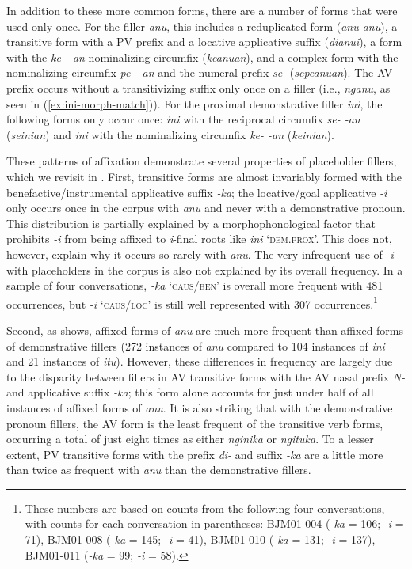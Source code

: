 \documentclass[output=paper,
\ChapterDOI{10.5281/zenodo.15697583}
colorlinks,
citecolor=brown]{langscibook}
\begin{document}
In addition to these more common forms, there are a number of forms that were used only once. For the filler \textit{anu}, this  includes a reduplicated form (\textit{anu-anu}), a transitive form with a PV prefix and a locative applicative suffix (\textit{dianui}), a form with the \textit{ke- -an} nominalizing circumfix (\textit{keanuan}), and a complex form with the nominalizing circumfix \textit{pe- -an} and the numeral prefix \textit{se-} (\textit{sepeanuan}). The AV prefix occurs without a transitivizing suffix only once on a filler (i.e., \textit{nganu}, as seen in (\ref{ex:ini-morph-match})). For the proximal demonstrative filler \textit{ini}, the following forms only occur once: \textit{ini} with the reciprocal circumfix \textit{se- -an} (\textit{seinian}) and \textit{ini} with the nominalizing circumfix \textit{ke- -an} (\textit{keinian}).

These patterns of affixation demonstrate several properties of placeholder fillers, which we revisit in . First, transitive forms are almost invariably formed with the benefactive/instrumental applicative suffix \textit{-ka}; the locative/goal applicative \textit{-i} only occurs once in the corpus with \textit{anu} and never with a demonstrative pronoun. This distribution is partially explained by a morphophonological factor that prohibits \textit{-i} from being affixed to \textit{i}-final roots like \textit{ini} `\textsc{dem.prox}'. This does not, however, explain why it occurs so rarely with \textit{anu}. The very infrequent use of \textit{-i} with placeholders in the corpus is also not explained by its overall frequency. In a sample of four conversations, \textit{-ka} `\textsc{caus/ben}' is overall more frequent with 481 occurrences, but \textit{-i} `\textsc{caus/loc}' is still well represented with 307 occurrences.\footnote{These numbers are based on counts from the following four conversations, with counts for each conversation in parentheses: BJM01-004 (\textit{-ka} = 106; \textit{-i} = 71), BJM01-008 (\textit{-ka} = 145; \textit{-i} = 41), BJM01-010 (\textit{-ka} = 131; \textit{-i} = 137), BJM01-011 (\textit{-ka} = 99; \textit{-i} = 58).}

Second, as  shows, affixed forms of \textit{anu} are much more frequent than affixed forms of demonstrative fillers (272 instances of \textit{anu} compared to 104 instances of \textit{ini} and 21 instances of \textit{itu}). However, these differences in frequency are largely due to the disparity between fillers in AV transitive forms with the AV nasal prefix \textit{N-} and applicative suffix \textit{-ka}; this form alone accounts for just under half of all instances of affixed forms of \textit{anu}. It is also striking that with the demonstrative pronoun fillers, the AV form is the least frequent of the transitive verb forms, occurring a total of just eight times as either \textit{nginika} or \textit{ngituka}. To a lesser extent, PV transitive forms with the prefix \textit{di-} and suffix \textit{-ka} are a little more than twice as frequent with \textit{anu} than the demonstrative fillers.
\end{document}
